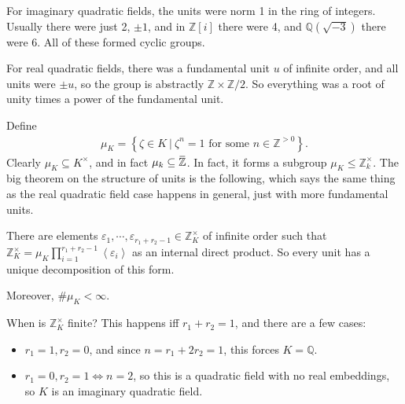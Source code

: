 \begin{remark}

For imaginary quadratic fields, the units were norm 1 in the ring of
integers. Usually there were just 2, \(\pm 1\), and in
\({\mathbb{Z}}[i]\) there were 4, and \({\mathbb{Q}}( \sqrt{-3} )\)
there were 6. All of these formed cyclic groups.

For real quadratic fields, there was a fundamental unit \(u\) of
infinite order, and all units were \(\pm u\), so the group is abstractly
\({\mathbb{Z}}\times{\mathbb{Z}}/2\). So everything was a root of unity
times a power of the fundamental unit.

Define
\begin{align*}
\mu_K = \left\{{ \zeta\in K {~\mathrel{\Big|}~}\zeta^n = 1 \text{ for some } n\in {\mathbb{Z}}^{> 0} }\right\} 
.\end{align*}
Clearly \(\mu_K \subseteq K^{\times}\), and in fact
\(\mu_k \subseteq \mkern 1.5mu\overline{\mkern-1.5mu{\mathbb{Z}}\mkern-1.5mu}\mkern 1.5mu\).
In fact, it forms a subgroup \(\mu_K \leq {\mathbb{Z}}_k^{\times}\). The
big theorem on the structure of units is the following, which says the
same thing as the real quadratic field case happens in general, just
with more fundamental units.

\end{remark}

\begin{theorem}

There are elements
\(\varepsilon_1, \cdots, \varepsilon_{r_1 + r_2 - 1} \in {\mathbb{Z}}_K^{\times}\)
of infinite order such that
\({\mathbb{Z}}_K^{\times}= \mu_K \prod_{i=1}^{r_1 + r_2 - 1} \left\langle{ \varepsilon_i }\right\rangle\)
as an internal direct product. So every unit has a unique decomposition
of this form.

Moreover, \(\# \mu_K < \infty\).

\end{theorem}

\begin{example}[?]

When is \({\mathbb{Z}}_K^{\times}\) finite? This happens iff
\(r_1 + r_2 = 1\), and there are a few cases:

\begin{itemize}
\tightlist
\item
  \(r_1=1, r_2=0\), and since \(n=r_1 + 2r_2 = 1\), this forces
  \(K = {\mathbb{Q}}\).
\item
  \(r_1 = 0, r_2 = 1 \iff n=2\), so this is a quadratic field with no
  real embeddings, so \(K\) is an imaginary quadratic field.
\end{itemize}

\end{example}

